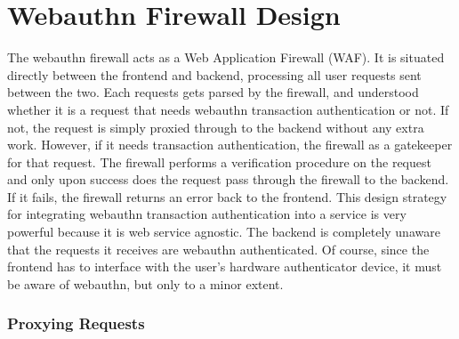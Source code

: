\chapter{Webauthn Firewall Design}

The webauthn firewall acts as a Web Application Firewall (WAF). It is situated directly between the frontend and backend, processing all user requests sent between the two. Each requests gets parsed by the firewall, and understood whether it is a request that needs webauthn transaction authentication or not. If not, the request is simply proxied through to the backend without any extra work. However, if it needs transaction authentication, the firewall as a gatekeeper for that request. The firewall performs a verification procedure on the request and only upon success does the request pass through the firewall to the backend. If it fails, the firewall returns an error back to the frontend. This design strategy for integrating webauthn transaction authentication into a service is very powerful because it is web service agnostic. The backend is completely unaware that the requests it receives are webauthn authenticated. Of course, since the frontend has to interface with the user's hardware authenticator device, it must be aware of webauthn, but only to a minor extent. 

\subsection{Proxying Requests}

